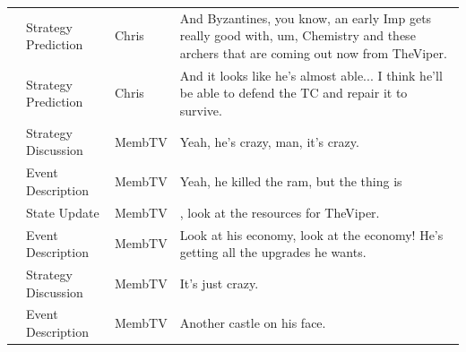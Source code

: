 {\begin{longtable}{@{}>{\theAppRow}r|L{2.3cm}L{1.0cm}U{11.55cm}@{}}
    & Strategy Prediction   & Chris        & And Byzantines, you know, an early Imp gets really good with, um, Chemistry and these archers that are coming out now from TheViper.                                                                                                                             \\
    & Strategy Prediction   & Chris        & And it looks like he's almost able... I think he'll be able to defend the TC and repair it to survive.                                                                                                                                                           \\
    & Strategy Discussion   & MembTV       & Yeah, he's crazy, man, it's crazy.                                                                                                                                                                                                                               \\
    & Event Description     & MembTV       & Yeah, he killed the ram, but the thing is                                                                                                                                                                                                                        \\
    & State Update          & MembTV       & , look at the resources for TheViper.                                                                                                                                                                                                                            \\
    & Event Description     & MembTV       & Look at his economy, look at the economy! He's getting all the upgrades he wants.                                                                                                                                                                                \\
    & Strategy Discussion   & MembTV       & It's just crazy.                                                                                                                                                                                                                                                 \\
    & Event Description     & MembTV       & Another castle on his face.                                                                                                                                                                                                                                      \\

\end{longtable}}
